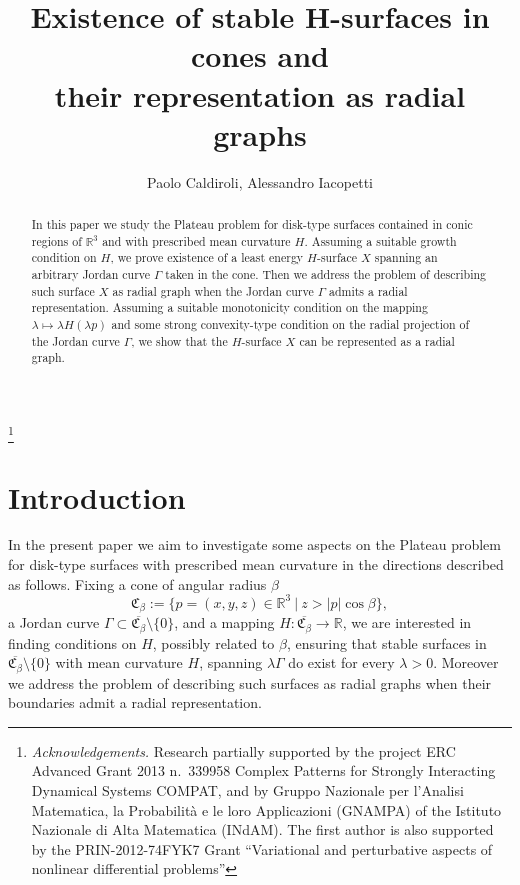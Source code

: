 \documentclass[a4paper,reqno,10pt,oneside]{amsart}
\numberwithin{equation}{section}
\begin{document}
\title[H-surfaces in cones]{Existence of stable H-surfaces in cones and\\ their representation as radial graphs}

\author{P\MakeLowercase{aolo} Caldiroli, A\MakeLowercase{lessandro} Iacopetti}

\thanks{\emph{Acknowledgements.} Research partially supported by the project ERC Advanced Grant 2013 n.~339958 Complex Patterns for Strongly Interacting Dynamical Systems COMPAT, and by Gruppo Nazionale per l'Analisi Matematica, la Pro\-ba\-bi\-li\-t\`a e le loro Applicazioni (GNAMPA) of the Istituto Nazionale di Alta Matematica (INdAM). The first author is also supported by the PRIN-2012-74FYK7 Grant ``Variational and perturbative aspects of nonlinear differential problems''}
\address[Paolo Caldiroli]{Dipartimento di Matematica, Universit\`a di Torino, via Carlo Alberto, 10 -- 10123 Torino, Italy}
\address[Alessandro Iacopetti]{Dipartimento di Matematica, Universit\`a di Torino, via Carlo Alberto, 10 -- 10123 Torino, Italy}
\begin{abstract}
In this paper we study the Plateau problem for disk-type surfaces contained in conic regions of ${\mathbb R}^{3}$ and with prescribed mean curvature $H$. Assuming a suitable growth condition on $H$, we prove existence of a least energy $H$-surface $X$ spanning an arbitrary Jordan curve $\Gamma$ taken in the cone. Then we address the problem of describing such surface $X$ as radial graph when the Jordan curve $\Gamma$ admits a radial representation. Assuming a suitable monotonicity condition on the mapping $\lambda\mapsto \lambda H(\lambda p)$ and some strong convexity-type condition on the radial projection of the Jordan curve $\Gamma$, we show that the $H$-surface $X$ can be represented as a radial graph.  
\end{abstract}

\maketitle

\section{Introduction}

In the present paper we aim to investigate some aspects on the Plateau problem for disk-type surfaces with prescribed mean curvature in the directions described as follows. 
Fixing a cone of angular radius $\beta$
$$
\mathfrak{C}_{\beta}:=\{p=(x,y,z)\in{\mathbb R}^3~|~ z>|p| \cos \beta\},
$$ 
a Jordan curve $\Gamma\subset\overline{\mathfrak{C}_{\beta}}\setminus\{0\}$, and a mapping $H\colon\overline{{\mathfrak{C}_{\beta}}}\to{\mathbb R}$, we are interested in finding conditions on $H$, possibly related to $\beta$, ensuring that stable surfaces in $\overline{\mathfrak{C}_{\beta}}\setminus\{0\}$ with mean curvature $H$, spanning $\lambda\Gamma$ do exist for every $\lambda>0$. Moreover we address the problem of describing such surfaces as radial graphs when their boundaries admit a radial representation. 
\end{document}
